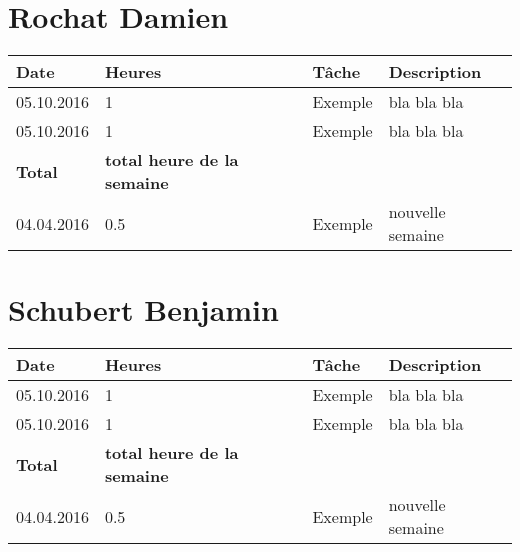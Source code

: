 \documentclass[french]{article}
\begin{document}
	\section*{Rochat Damien}
	\begin{longtable}{p{}|p{}|p{}|p{}}
		Date&Heures&Tâche&Description\\
		\hline \hline
		05.10.2016 & 1 & Exemple & bla bla bla\\
		05.10.2016 & 1 & Exemple & bla bla bla\\
		\textbf{Total} & \textbf{total heure de la semaine} &&\\
		\hline
		04.04.2016 & 0.5 & Exemple & nouvelle semaine \\
	\end{longtable}
	
	\section*{Schubert Benjamin}
	\begin{longtable}{p{}|p{}|p{}|p{}}
		Date&Heures&Tâche&Description\\
		\hline \hline
		05.10.2016 & 1 & Exemple & bla bla bla\\
		05.10.2016 & 1 & Exemple & bla bla bla\\
		\textbf{Total} & \textbf{total heure de la semaine} &&\\
		\hline
		04.04.2016 & 0.5 & Exemple & nouvelle semaine \\
	\end{longtable}
	
\end{document}
